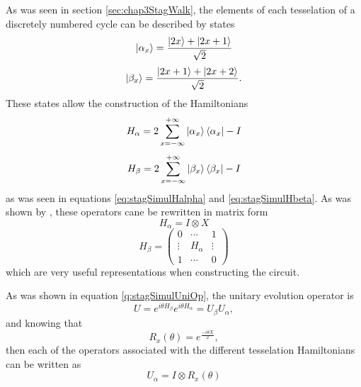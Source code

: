 \documentclass[../../dissertation.tex]{subfiles}
\begin{document}
As was seen in section \ref{sec:chap3StagWalk}, the elements of each
tesselation of a discretely numbered cycle can be described by states
\begin{equation}
        \ket{\alpha_x} = \frac{\ket{2x} + \ket{2x+1}}{\sqrt{2}}
\end{equation}
\begin{equation}
        \ket{\beta_x} = \frac{\ket{2x+1}+\ket{2x+2}}{\sqrt{2}}.
\end{equation}
These states allow the construction of the Hamiltonians
\begin{equation}
        H_\alpha = 2\sum_{x=-\infty}^{+\infty}\ket{\alpha_{x}}\bra{\alpha_x} - I
\end{equation}
\begin{equation}
        H_\beta = 2\sum_{x=-\infty}^{+\infty}\ket{\beta_{x}}\bra{\beta_x} - I
\end{equation}
as was seen in equations \ref{eq:stagSimulHalpha} and \ref{eq:stagSimulHbeta}.
As was shown by \cite{acasiete2020}, these operators cane be rewritten in
matrix form 
\begin{equation}
	H_\alpha = I \otimes X
\end{equation}
\begin{equation} 
	H_\beta = 
	\begin{pmatrix}
	0 & \cdots & 1\\
	\vdots & H_\alpha & \vdots\\
	1 & \cdots & 0
	\end{pmatrix}
\end{equation} 
which are very useful representations when constructing the circuit.\par
As was shown in equation \ref{q:stagSimulUniOp}, the unitary evolution operator is
\begin{equation}
	U = e^{i\theta H_\beta}e^{i\theta H_\alpha} = U_\beta U_\alpha, 
\end{equation} 
and knowing that
\begin{equation} 
	R_x(\theta) = e^{\frac{-i\theta X}{2}}, 
\end{equation} 
then each of the operators associated with the different tesselation
Hamiltonians can be written as
\begin{equation} 
	U_\alpha = I \otimes R_x(\theta) 
\end{equation}
\end{document}
